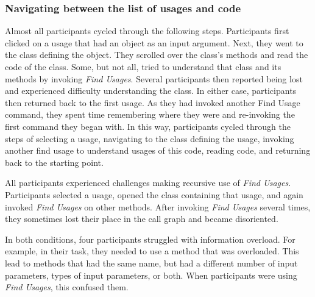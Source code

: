 \documentclass[conference]{IEEEtran}
\begin{document}
\subsubsection{Navigating between the list of usages and code}Almost all participants cycled through the following steps.
Participants first clicked on a usage that had an object as an input argument. Next, they went to the class defining the object. They scrolled over the class's methods and read the code of the class. Some, but not all, tried to understand that class and its methods by invoking \textit{Find Usages}. Several participants then reported being lost and experienced difficulty understanding the class. In either case, participants then returned back to the first usage. As they had invoked another Find Usage command, they spent time remembering where they were and re-invoking the first command they began with. In this way, participants cycled through the steps of 
selecting a usage, navigating to the class defining the usage, invoking another find usage to understand usages of this code, reading code, and returning back to the starting point. \par

All participants experienced challenges making recursive use of \textit{Find Usages}. Participants selected a usage, opened the class containing that usage, and again invoked \textit{Find Usages} on other methods. After invoking \textit{Find Usages} several times, they sometimes lost their place in the call graph and became disoriented. \par

In both conditions, four participants struggled with information overload. For example, in their task, they needed to use a method that was overloaded. This lead to methods that had the same name, but had a different number of input parameters, types of input parameters, or both. When participants were using \textit{Find Usages}, this confused them.\par
\end{document}
